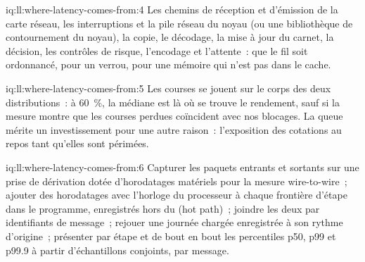 \begin{solution}{iq:ll:where-latency-comes-from:4}
Les chemins de réception et d'émission de la carte réseau, les interruptions et la pile réseau du noyau (ou une bibliothèque de
contournement du noyau), la copie, le décodage, la mise à jour du carnet, la décision, les contrôles de risque, l'encodage et l'attente~: que le fil soit
ordonnancé, pour un verrou, pour une mémoire qui n'est pas dans le cache.
\end{solution}

\begin{solution}{iq:ll:where-latency-comes-from:5}
Les courses se jouent sur le corps des deux distributions~: à 60~\%, la médiane est là où se trouve le rendement, sauf si la
mesure montre que les courses perdues coïncident avec nos blocages. La queue mérite un investissement pour une autre raison~: l'exposition des cotations au repos
tant qu'elles sont périmées.
\end{solution}

\begin{solution}{iq:ll:where-latency-comes-from:6}
Capturer les paquets entrants et sortants sur une prise de dérivation dotée d'horodatages matériels pour la mesure wire-to-wire~; ajouter des horodatages avec
l'horloge du processeur à chaque frontière d'étape dans le programme, enregistrés hors du  (hot path)~; joindre les deux par
identifiants de message~; rejouer une journée chargée enregistrée à son rythme d'origine~; présenter par étape et de bout en bout les percentiles p50, p99 et p99.9
à partir d'échantillons conjoints, par message.
\end{solution}
